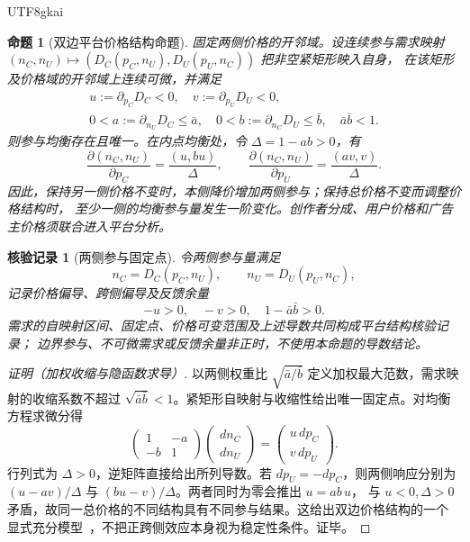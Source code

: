 \documentclass[12pt,a4paper,openany]{report}
\newtheorem{proposition}{命题}[chapter]
\newtheorem{Certificate}{核验记录}[chapter]
\begin{document}
\begin{CJK*}{UTF8}{gkai}
\begin{proposition}[双边平台价格结构命题]
\label{prop:two-sided-platform-price-structure}
固定两侧价格的开邻域。设连续参与需求映射
\((n_C,n_U)\mapsto(D_C(p_C,n_U),D_U(p_U,n_C))\) 把非空紧矩形映入自身，
在该矩形及价格域的开邻域上连续可微，并满足
\[
  \begin{gathered}
  u:=\partial_{p_C}D_C<0,\quad v:=\partial_{p_U}D_U<0,\\
  0<a:=\partial_{n_U}D_C\le\bar a,\quad
  0<b:=\partial_{n_C}D_U\le\bar b,\quad \bar a\bar b<1.
  \end{gathered}
\]
则参与均衡存在且唯一。在内点均衡处，令 \(\Delta=1-ab>0\)，有
\[
 \frac{\partial(n_C,n_U)}{\partial p_C}=\frac{(u,bu)}{\Delta},
 \qquad
 \frac{\partial(n_C,n_U)}{\partial p_U}=\frac{(av,v)}{\Delta}.
\]
因此，保持另一侧价格不变时，本侧降价增加两侧参与；保持总价格不变而调整价格结构时，
至少一侧的均衡参与量发生一阶变化。创作者分成、用户价格和广告主价格须联合进入平台分析。
\end{proposition}

\begin{Certificate}[两侧参与固定点]
令两侧参与量满足
\[
  n_C=D_C(p_C,n_U),\qquad
  n_U=D_U(p_U,n_C),
\]
记录价格偏导、跨侧偏导及反馈余量
\[
  -u>0,\quad -v>0,\quad 1-\bar a\bar b>0.
\]
需求的自映射区间、固定点、价格可变范围及上述导数共同构成平台结构核验记录；
边界参与、不可微需求或反馈余量非正时，不使用本命题的导数结论。
\end{Certificate}

\begin{proof}[证明（加权收缩与隐函数求导）]
以两侧权重比 \(\sqrt{\bar a/\bar b}\) 定义加权最大范数，需求映射的收缩系数不超过
\(\sqrt{\bar a\bar b}<1\)。紧矩形自映射与收缩性给出唯一固定点。对均衡方程求微分得
\[
 \begin{pmatrix}1&-a\\-b&1\end{pmatrix}
 \begin{pmatrix}dn_C\\dn_U\end{pmatrix}
 =
 \begin{pmatrix}u\,dp_C\\v\,dp_U\end{pmatrix}.
\]
行列式为 \(\Delta>0\)，逆矩阵直接给出所列导数。若 \(dp_U=-dp_C\)，则两侧响应分别为
\((u-av)/\Delta\) 与 \((bu-v)/\Delta\)。两者同时为零会推出 \(u=ab\,u\)，
与 \(u<0,\Delta>0\) 矛盾，故同一总价格的不同结构具有不同参与结果。这给出双边价格结构的一个
显式充分模型~\cite{RochetTirole2003TwoSided}，不把正跨侧效应本身视为稳定性条件。证毕。
\end{proof}


\end{CJK*}
\end{document}
